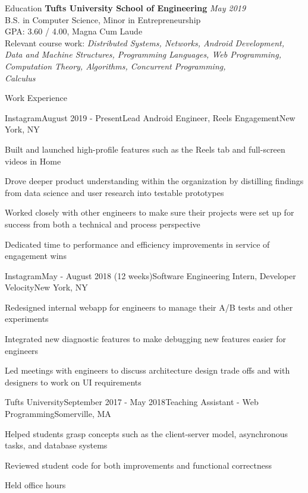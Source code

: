 \documentclass{resume}
\begin{document}
  \begin{rSection}{Education}
    {\bf Tufts University School of Engineering} \hfill {\em May 2019} \\
    { B.S. in Computer Science, Minor in Entrepreneurship} \\
    GPA: 3.60 / 4.00, Magna Cum Laude\\
    Relevant course work: \textit{Distributed Systems, 
      Networks, 
      Android Development, 
      Data and Machine Structures, 
      Programming Languages, 
      Web Programming, 
      Computation Theory, 
      Algorithms, 
      Concurrent Programming, \\
      Calculus
    }
  \end{rSection}

  \begin{rSection}{Work Experience}

    \begin{rSubsection}{Instagram}{August 2019 - Present}{Lead Android Engineer, Reels Engagement}{New York, NY}
      \item Built and launched high-profile features such as the Reels tab and full-screen videos in Home
      \item Drove deeper product understanding within the organization by distilling findings from data science and user research into testable prototypes
      \item Worked closely with other engineers to make sure their projects were set up for success from both a technical and process perspective
      \item Dedicated time to performance and efficiency improvements in service of engagement wins
    \end{rSubsection}

    \begin{rSubsection}{Instagram}{May - August 2018 (12 weeks)}{Software Engineering Intern, Developer Velocity}{New York, NY}
      \item Redesigned internal webapp for engineers to manage their A/B tests and other experiments
      \item Integrated new diagnostic features to make debugging new features easier for engineers
      \item Led meetings with engineers to discuss architecture design trade offs and with designers to work on UI requirements
    \end{rSubsection}

    \begin{rSubsection}{Tufts University}{September 2017 - May 2018}{Teaching Assistant - Web Programming}{Somerville, MA}
      \item Helped students grasp concepts such as the client-server model, asynchronous tasks, and database systems
      \item Reviewed student code for both improvements and functional correctness
      \item Held office hours
    \end{rSubsection}


\end{rSection}
\end{document}

